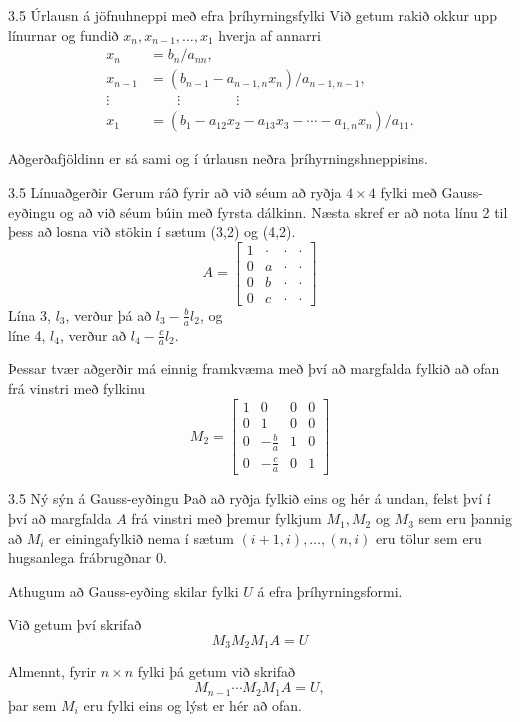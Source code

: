 \begin{frame}{3.5 Úrlausn á jöfnuhneppi með efra þríhyrningsfylki} 
Við getum rakið okkur upp línurnar og fundið $x_n,x_{n-1},\dots,x_1$
hverja af annarri 
\begin{align*}
	x_n& = b_n/a_{nn},\\
	x_{n-1}& = (b_{n-1}-a_{n-1,n}x_n)/a_{n-1,n-1},\\
	\vdots&\qquad \vdots\qquad \qquad \vdots\\
	x_1& = (b_1-a_{12}x_2-a_{13}x_3-\cdots
	-a_{1,n}x_{n})/a_{11}.
\end{align*}

\pause
Aðgerðafjöldinn er sá sami og í úrlausn neðra
þríhyrningshneppisins.
\end{frame}

\begin{frame}{3.5 Línuaðgerðir} 
 Gerum ráð fyrir að við séum að ryðja $4\times 4$ fylki með Gauss-eyðingu og 
að við séum búin með fyrsta dálkinn. Næsta skref er að nota línu 2 til þess 
að losna við stökin í sætum (3,2) og (4,2).
$$A=
\left[\begin{array}{llll}
1 & \cdot & \cdot & \cdot\\
0 & a & \cdot & \cdot\\
0 & b & \cdot & \cdot\\
0 & c & \cdot & \cdot
\end{array}\right]
$$
Lína 3, $l_3$, verður þá að $l_3 - \frac ba l_2$, \pause og \\
líne 4, $l_4$, verður að $l_4 - \frac ca l_2$.

\pause

Þessar tvær aðgerðir má einnig framkvæma með því að margfalda fylkið að ofan frá vinstri með
fylkinu
$$
M_2 = \left[
\begin{array}{llll}
1 & 0 & 0 & 0\\
0 & 1 & 0 & 0\\
0 & -\frac ba & 1 & 0\\
0 & -\frac ca & 0 & 1
\end{array}
\right]
$$
\end{frame}

\begin{frame}{3.5 Ný sýn á Gauss-eyðingu}
 Það að ryðja fylkið eins og hér á undan, felst því í því að margfalda $A$ frá vinstri með þremur fylkjum
$M_1, M_2$ og $M_3$ sem eru þannig að $M_i$ er einingafylkið nema í sætum $(i+1,i),\ldots,(n,i)$ 
eru tölur sem eru hugsanlega frábrugðnar 0.

\smallskip
\pause

Athugum að Gauss-eyðing skilar fylki $U$ á efra þríhyrningsformi. \pause

\smallskip

Við getum því skrifað
$$M_3 M_2 M_1 A = U$$

\pause\smallskip

Almennt, fyrir $n \times n$ fylki þá getum við skrifað
$$
M_{n-1}\cdots M_2 M_1 A = U,
$$
þar sem $M_i$ eru fylki eins og lýst er hér að ofan.
\end{frame}

